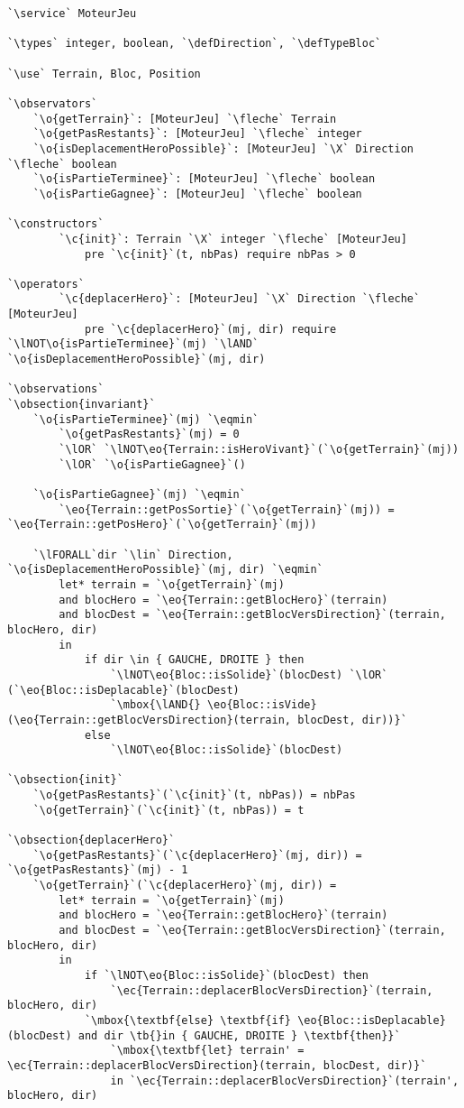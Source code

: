 \documentclass{article}
\newcommand{\tb}{\textbackslash{}}
\newcommand{\fleche}{$\rightarrow{}$}
\newcommand{\X}{$\times{}$}
\newcommand{\eqmin}{$\overset{min}{=}$}
\newcommand{\lAND}{$\land$}
\newcommand{\lOR}{$\lor$}
\newcommand{\lNOT}{$\lnot$}
\newcommand{\lFORALL}{$\forall$}
\newcommand{\lin}{$\in$}
\newcommand{\specsec}[1]{\normalfont{\large{\textbf{#1:}}}}
\newcommand{\service}{\specsec {Service}}
\newcommand{\types}{\specsec {Types}}
\newcommand{\use}{\specsec {Use}}
\newcommand{\observators}{\specsec {Observators}}
\newcommand{\constructors}{\specsec {Constructors}}
\newcommand{\operators}{\specsec {Operators}}
\newcommand{\observations}{\specsec {Observations}}
\newcommand{\obsection}[1]{\textbf{[#1]}}
\newcommand{\TypeBloc}{TypeBloc}
\newcommand{\defTypeBloc}{\mbox{enum \TypeBloc}~\{~VIDE, TERRE, MUR, HERO, SORTIE\_FERMEE, SORTIE\_OUVERTE, ROCHER, DIAMANT~\}}
\newcommand{\Direction}{Direction}
\newcommand{\defDirection}{\mbox{enum \Direction}~\{~HAUT, BAS, GAUCHE, DROITE~\}}
\renewcommand{\o}[1]{\textcolor{blue}{#1}}
\renewcommand{\c}[1]{\textcolor{red}{#1}}
\newcommand{\eo}[1]{\textcolor{RoyalPurple}{#1}}
\newcommand{\ec}[1]{\textcolor{BrickRed}{#1}}
\begin{document}
\begin{lstlisting}[caption=MoteurJeu]
`\service` MoteurJeu

`\types` integer, boolean, `\defDirection`, `\defTypeBloc`

`\use` Terrain, Bloc, Position

`\observators`
	`\o{getTerrain}`: [MoteurJeu] `\fleche` Terrain
	`\o{getPasRestants}`: [MoteurJeu] `\fleche` integer
	`\o{isDeplacementHeroPossible}`: [MoteurJeu] `\X` Direction `\fleche` boolean
	`\o{isPartieTerminee}`: [MoteurJeu] `\fleche` boolean
	`\o{isPartieGagnee}`: [MoteurJeu] `\fleche` boolean

`\constructors`
		`\c{init}`: Terrain `\X` integer `\fleche` [MoteurJeu]
			pre `\c{init}`(t, nbPas) require nbPas > 0

`\operators`
		`\c{deplacerHero}`: [MoteurJeu] `\X` Direction `\fleche` [MoteurJeu]
			pre `\c{deplacerHero}`(mj, dir) require `\lNOT\o{isPartieTerminee}`(mj) `\lAND` `\o{isDeplacementHeroPossible}`(mj, dir)

`\observations`
`\obsection{invariant}`
	`\o{isPartieTerminee}`(mj) `\eqmin`
		`\o{getPasRestants}`(mj) = 0
		`\lOR` `\lNOT\eo{Terrain::isHeroVivant}`(`\o{getTerrain}`(mj))
		`\lOR` `\o{isPartieGagnee}`()

	`\o{isPartieGagnee}`(mj) `\eqmin`
		`\eo{Terrain::getPosSortie}`(`\o{getTerrain}`(mj)) = `\eo{Terrain::getPosHero}`(`\o{getTerrain}`(mj))

	`\lFORALL`dir `\lin` Direction, `\o{isDeplacementHeroPossible}`(mj, dir) `\eqmin`
		let* terrain = `\o{getTerrain}`(mj)
		and blocHero = `\eo{Terrain::getBlocHero}`(terrain)
		and blocDest = `\eo{Terrain::getBlocVersDirection}`(terrain, blocHero, dir)
		in
			if dir \in { GAUCHE, DROITE } then
				`\lNOT\eo{Bloc::isSolide}`(blocDest) `\lOR` (`\eo{Bloc::isDeplacable}`(blocDest)
				`\mbox{\lAND{} \eo{Bloc::isVide}(\eo{Terrain::getBlocVersDirection}(terrain, blocDest, dir))}`
			else
				`\lNOT\eo{Bloc::isSolide}`(blocDest)

`\obsection{init}`
	`\o{getPasRestants}`(`\c{init}`(t, nbPas)) = nbPas
	`\o{getTerrain}`(`\c{init}`(t, nbPas)) = t

`\obsection{deplacerHero}`
	`\o{getPasRestants}`(`\c{deplacerHero}`(mj, dir)) = `\o{getPasRestants}`(mj) - 1
	`\o{getTerrain}`(`\c{deplacerHero}`(mj, dir)) =
		let* terrain = `\o{getTerrain}`(mj)
		and blocHero = `\eo{Terrain::getBlocHero}`(terrain)
		and blocDest = `\eo{Terrain::getBlocVersDirection}`(terrain, blocHero, dir)
		in
			if `\lNOT\eo{Bloc::isSolide}`(blocDest) then
				`\ec{Terrain::deplacerBlocVersDirection}`(terrain, blocHero, dir)
			`\mbox{\textbf{else} \textbf{if} \eo{Bloc::isDeplacable}(blocDest) and dir \tb{}in { GAUCHE, DROITE } \textbf{then}}`
				`\mbox{\textbf{let} terrain' = \ec{Terrain::deplacerBlocVersDirection}(terrain, blocDest, dir)}`
				in `\ec{Terrain::deplacerBlocVersDirection}`(terrain', blocHero, dir)
\end{lstlisting}
\end{document}
